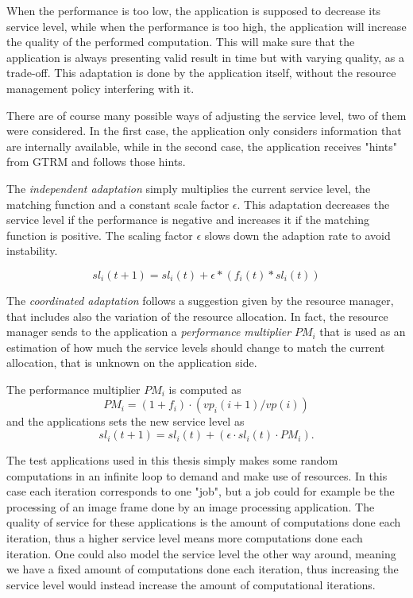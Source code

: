 \documentclass[nobiblatex]{LTHthesis}
\begin{document}
When the performance is too low, the application is supposed to decrease its
service level, while when the performance is too high, the application will
increase the quality of the performed computation. This will make sure that
the application is always presenting valid result in time but with varying
quality, as a trade-off. This adaptation is done by the application itself,
without the resource management policy interfering with it.

There are of course many possible ways of adjusting the service level, two of them were considered.
In the first case, the application only considers information that are
internally available, while in the second case, the application receives
"hints" from GTRM and follows those hints.

The \emph{independent adaptation} simply multiplies the current service level,
the matching function and a constant scale factor $\epsilon$. This adaptation
decreases the service level if the performance is negative and increases it 
if the matching function is positive. The scaling factor $\epsilon$ slows 
down the adaption rate to avoid instability. 

\begin{equation}
sl_i(t+1)= sl_i(t) + \epsilon*(f_i(t)*sl_i(t))
\label{eq:simple_sl_rec}
\end{equation}

The \emph{coordinated adaptation} follows a suggestion given by the resource
manager, that includes also the variation of the resource allocation. In fact,
the resource manager sends to the application a \emph{performance multiplier}
$PM_i$ that is used as an estimation of how much the service levels should
change to match the current allocation, that is unknown on the application
side.

The performance multiplier $PM_i$ is computed as
\begin{equation}
PM_i = (1+f_i) \cdot (vp_i(i+1)/vp(i))
\end{equation}
and the applications sets the new service level as
\begin{equation}
sl_i(t+1) = sl_i(t) + (\epsilon \cdot sl_i(t) \cdot PM_i).
\end{equation}

The test applications used in this thesis simply makes some random computations in an infinite loop to demand and make use of resources. In this case each iteration corresponds to one "job", but a job could for example be the processing of an image frame done by an image processing application. The quality of service for these applications is the amount of computations done each iteration, thus a higher service level means more computations done each iteration. One could also model the service level the other way around, meaning we have a fixed amount of computations done each iteration, thus increasing the service level would instead increase the amount of computational iterations.
\end{document}
